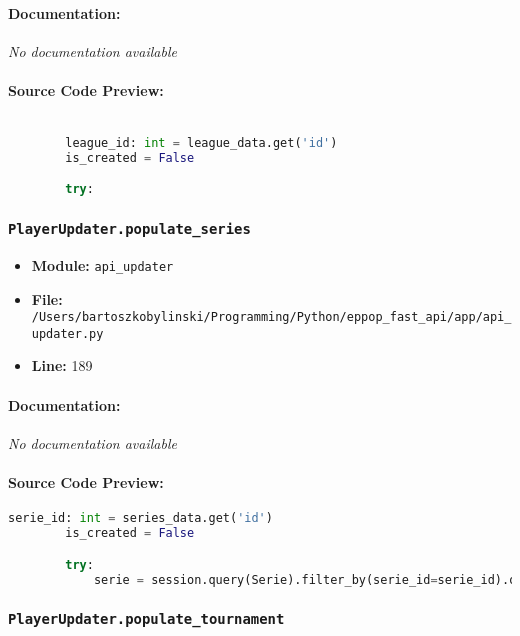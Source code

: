 \documentclass[11pt,a4paper]{article}
\begin{document}
\paragraph{Documentation:} \textit{No documentation available}

\paragraph{Source Code Preview:}
\begin{lstlisting}[language=Python]

        league_id: int = league_data.get('id')
        is_created = False

        try:
\end{lstlisting}

\vspace{1em}
\subsubsection{\texttt{PlayerUpdater.populate\_series}}

\begin{itemize}
    \item \textbf{Module:} \texttt{api\_updater}
    \item \textbf{File:} \texttt{/Users/bartoszkobylinski/Programming/Python/eppop\_fast\_api/app/api\_updater.py}
    \item \textbf{Line:} 189
\end{itemize}

\paragraph{Documentation:} \textit{No documentation available}

\paragraph{Source Code Preview:}
\begin{lstlisting}[language=Python]
        serie_id: int = series_data.get('id')
        is_created = False

        try:
            serie = session.query(Serie).filter_by(serie_id=serie_id).one_or_none()
\end{lstlisting}

\vspace{1em}
\subsubsection{\texttt{PlayerUpdater.populate\_tournament}}
\end{document}
